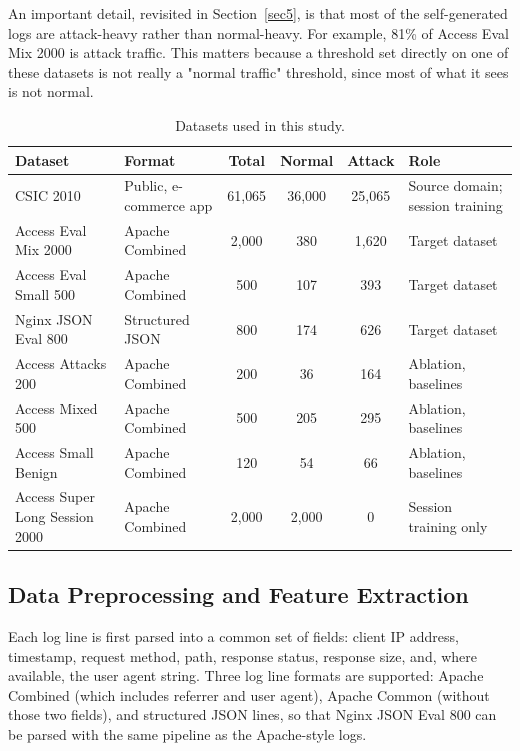 \documentclass[futureinternet,article,accept,moreauthors]{Definitions/mdpi}
\begin{document}
An important detail, revisited in Section~\ref{sec5}, is that most of the self-generated logs are attack-heavy rather than normal-heavy. For example, 81\% of Access Eval Mix 2000 is attack traffic. This matters because a threshold set directly on one of these datasets is not really a "normal traffic" threshold, since most of what it sees is not normal.

\begin{table}[H]
\caption{Datasets used in this study.}
\label{tab:datasets}
\begin{tabularx}{\textwidth}{lXCCCl}
\toprule
\textbf{Dataset} & \textbf{Format} & \textbf{Total} & \textbf{Normal} & \textbf{Attack} & \textbf{Role} \\
\midrule
CSIC 2010 & Public, e-commerce app & 61{,}065 & 36{,}000 & 25{,}065 & Source domain; session training \\
Access Eval Mix 2000 & Apache Combined & 2{,}000 & 380 & 1{,}620 & Target dataset \\
Access Eval Small 500 & Apache Combined & 500 & 107 & 393 & Target dataset \\
Nginx JSON Eval 800 & Structured JSON & 800 & 174 & 626 & Target dataset \\
Access Attacks 200 & Apache Combined & 200 & 36 & 164 & Ablation, baselines \\
Access Mixed 500 & Apache Combined & 500 & 205 & 295 & Ablation, baselines \\
Access Small Benign & Apache Combined & 120 & 54 & 66 & Ablation, baselines \\
Access Super Long Session 2000 & Apache Combined & 2{,}000 & 2{,}000 & 0 & Session training only \\
\bottomrule
\end{tabularx}
\end{table}

\subsection{Data Preprocessing and Feature Extraction}

Each log line is first parsed into a common set of fields: client IP address, timestamp, request method, path, response status, response size, and, where available, the user agent string. Three log line formats are supported: Apache Combined (which includes referrer and user agent), Apache Common (without those two fields), and structured JSON lines, so that Nginx JSON Eval 800 can be parsed with the same pipeline as the Apache-style logs.
\end{document}
